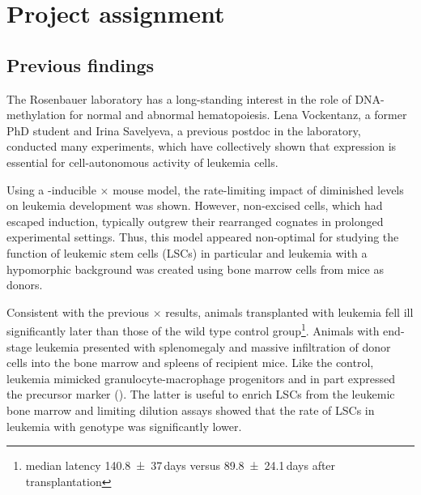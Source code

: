 \chapter{Project assignment}
\section{Previous findings}
\label{chap:i:project:previous_results}

The Rosenbauer laboratory has a long-standing interest in the role of DNA-methylation for normal and abnormal hematopoiesis\cite{Broeske2009,Vockentanz2010}. Lena Vockentanz, a former PhD student\cite{Vockentanz2011} and Irina Savelyeva, a previous postdoc in the laboratory, conducted many experiments, which have collectively shown that  expression is essential for cell-autonomous activity of \mllafnine leukemia cells. 

Using a \polyic-inducible \mllafnine \cremx \ensuremath{\times} \dnmtfloxchip mouse model, the rate-limiting impact of diminished  levels on leukemia development was shown. However, non-excised \dnmtfloxchip cells, which had escaped induction, typically outgrew their rearranged cognates in prolonged experimental settings. Thus, this model appeared non-optimal for studying the function of leukemic stem cells (LSCs) in particular and \mllafnine leukemia with a  hypomorphic background was created using bone marrow cells from \dnmtchip mice as donors.

Consistent with the previous \mllafnine \cremx \ensuremath{\times} \dnmtfloxchip results, animals transplanted with \dnmtchip \mllafnine leukemia fell ill significantly later than those of the wild type control group\footnote{median latency \num[separate-uncertainty = true]{140.8\pm37}\,days versus \num[separate-uncertainty = true]{89.8\pm24.1}\,days after transplantation}. Animals with end-stage leukemia presented with splenomegaly and massive infiltration of donor \mllafninegfp cells into the bone marrow and spleens of recipient mice. Like the \dnmtwt control, \dnmtchip \mllafnine leukemia mimicked \cdelevenbpos granulocyte-macrophage progenitors and in part expressed the precursor marker \cdonehundretseventeenpos (\kit). The latter is useful to enrich LSCs from the leukemic bone marrow\cite{Krivtsov2006,Somervaille2006} and limiting dilution assays showed that the rate of LSCs in leukemia with \dnmtchip genotype was significantly lower\cite{Vockentanz2011}. 

